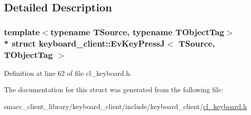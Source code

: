 \subsection{Detailed Description}
\subsubsection*{template$<$typename T\+Source, typename T\+Object\+Tag$>$\\*
struct keyboard\+\_\+client\+::\+Ev\+Key\+Press\+J$<$ T\+Source, T\+Object\+Tag $>$}



Definition at line 62 of file cl\+\_\+keyboard.\+h.



The documentation for this struct was generated from the following file\+:\begin{DoxyCompactItemize}
\item 
smacc\+\_\+client\+\_\+library/keyboard\+\_\+client/include/keyboard\+\_\+client/\hyperlink{cl__keyboard_8h}{cl\+\_\+keyboard.\+h}\end{DoxyCompactItemize}
